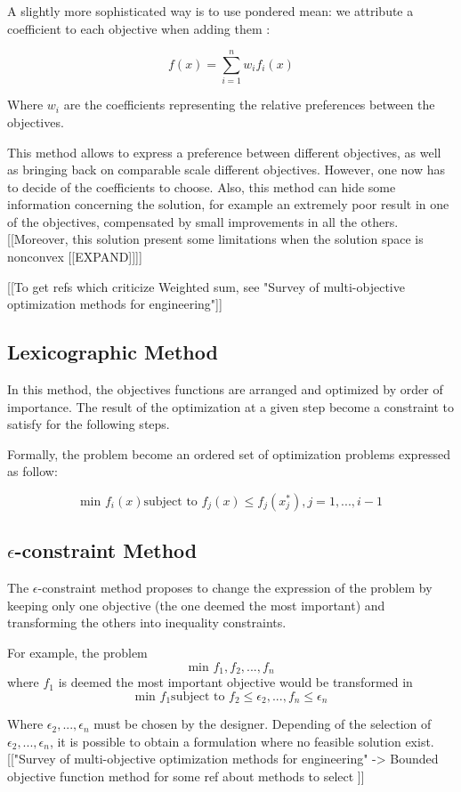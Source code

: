 A slightly more sophisticated way is to use pondered mean: we attribute a coefficient to each objective when adding them :

\[ f(x) =\sum_{i=1}^n w_i f_i(x) \]

Where $w_i$ are the coefficients representing the relative preferences between the objectives.

This method allows to express a preference between different objectives, as well as bringing back on comparable scale different objectives. However, one now has to decide of the coefficients to choose. Also, this method can hide some information concerning the solution, for example an extremely poor result in one of the objectives, compensated by small improvements in all the others.  [[Moreover, this solution present some limitations when the solution space is nonconvex [[EXPAND]]]]

[[To get refs which criticize Weighted sum, see "Survey of multi-objective optimization methods for engineering"]]

\subsection{Lexicographic Method}

In this method, the objectives functions are arranged and optimized by order of importance. The result of the optimization at a given step become a constraint to satisfy for the following steps.

Formally, the problem become an ordered set of optimization problems expressed as follow:

\[
\mbox{min } f_i(x)
\mbox{subject to }f_j(x) \leq f_j(x_j^*), j = 1, ..., i-1
\]

\subsection{$\epsilon$-constraint Method}

The $\epsilon$-constraint method proposes to change the expression of the problem by keeping only one objective (the one deemed the most important) and transforming the others into inequality constraints.

For example, the problem \[\mbox{min } f_1, f_2, ...,f_n\] where $f_1$ is deemed the most important objective would be transformed in
\[
\mbox{min } f_1
\mbox{subject to } f_2 \leq \epsilon_2, ..., f_n \leq \epsilon_n
\]

Where $\epsilon_2, ..., \epsilon_n$ must be chosen by the designer.
Depending of the selection of $\epsilon_2, ..., \epsilon_n$, it is possible to obtain a formulation where no feasible solution exist.
[["Survey of multi-objective optimization methods for engineering" -> Bounded objective function method for some ref about methods to select \epsilon]]

